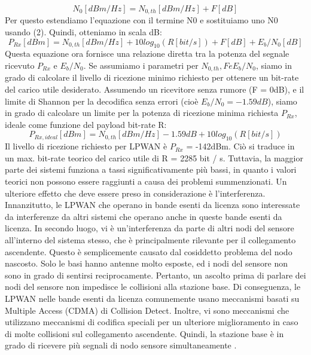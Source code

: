 \documentclass[a4paper]{report} %
\begin{document}
\begin{equation}
N_{0}[dBm/Hz] = N_{0,th}[dBm/Hz] + F[dB]
\end{equation} 
Per questo estendiamo l'equazione con il termine N0 e sostituiamo uno N0 usando (2). Quindi, otteniamo in scala dB:
\begin{equation}
P_{Rx}[dBm] = N_{0,th}[dBm/Hz] + 10log_{10} (R[bit/s])+F[dB] + E_{b}/N_{0}[dB]
\end{equation}
Questa equazione ora fornisce una relazione diretta tra la potenza del segnale ricevuto $P_{Rx}$ e $E_{b} / N_{0}$. Se assumiamo i parametri per $N_{0, th}, F e E_{b} / N_{0}$, siamo in grado di calcolare il livello di ricezione minimo richiesto per ottenere un bit-rate del carico utile desiderato. Assumendo un ricevitore senza rumore (F = 0dB), e il limite di Shannon per la decodifica senza errori (cioè $E_{b} / N_{0} = -1.59 dB$), siamo in grado di calcolare un limite per la potenza di ricezione minima richiesta $P_{Rx}$, ideale come funzione del payload bit-rate R:
\begin{equation}
P_{Rx,ideal}[dBm] = N_{0,th}[dBm/Hz] - 1.59dB + 10log_{10}(R[bit/s])
\end{equation} 
 Il livello di ricezione richiesto per LPWAN è $P_{Rx}$ = -142dBm. Ciò si traduce in un max. bit-rate teorico del carico utile di R = 2285 bit / s. Tuttavia, la maggior parte dei sistemi funziona a tassi significativamente più bassi, in quanto i valori teorici non possono essere raggiunti a causa dei problemi summenzionati. Un ulteriore effetto che deve essere preso in considerazione è l'interferenza. Innanzitutto, le LPWAN che operano in bande esenti da licenza sono interessate da interferenze da altri sistemi che operano anche in queste bande esenti da licenza. In secondo luogo, vi è un'interferenza da parte di altri nodi del sensore all'interno del sistema stesso, che è principalmente rilevante per il collegamento ascendente. Questo è semplicemente causato dal cosiddetto problema del nodo nascosto. Solo le basi hanno antenne molto esposte, ed i nodi del sensore non sono in grado di sentirsi reciprocamente. Pertanto, un ascolto prima di parlare dei nodi del sensore non impedisce le collisioni alla stazione base. Di conseguenza, le LPWAN nelle bande esenti da licenza comunemente usano meccanismi basati su Multiple Access (CDMA) di Collision Detect. Inoltre, vi sono meccanismi che utilizzano meccanismi di codifica speciali per un ulteriore miglioramento in caso di molte collisioni sul collegamento ascendente. Quindi, la stazione base è in grado di ricevere più segnali di nodo sensore simultaneamente \cite{art:rif.40}.
\end{document}
